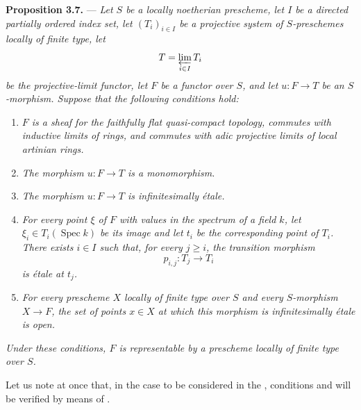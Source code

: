 
\medskip
\noindent{}\textbf{Proposition 3.7.} ---
\textit{Let \(S\) be a locally noetherian prescheme, let \(I\) be a
directed partially ordered index set, let \((T_i)_{i\in I}\) be a
projective system of \(S\)-preschemes locally of finite type, let
\[
  T=\varprojlim_{i\in I}T_i
\]
be the projective-limit functor, let \(F\) be a functor over \(S\),
and let \(u:F\to T\) be an \(S\)-morphism.  Suppose that the following
conditions hold:}

\begin{enumerate}
\item[(a)] %
\textit{\(F\) is a sheaf for the faithfully flat quasi-compact
topology, commutes with inductive limits of rings, and commutes with
adic projective limits of local artinian rings.}

\item[(b)] %
\textit{The morphism \(u:F\to T\) is a monomorphism.}

\item[\(b'\)] %
\textit{The morphism \(u:F\to T\) is infinitesimally étale.}

\item[(c)] %
\textit{For every point \(\xi\) of \(F\) with values in the spectrum
of a field \(k\), let
\(\xi_i\in T_i(\operatorname{Spec}k)\) be its image and let \(t_i\)
be the corresponding point of \(T_i\).  There exists \(i\in I\) such
that, for every \(j\geq i\), the transition morphism
\[
  p_{i,j}:T_j\longrightarrow T_i
\]
is étale at \(t_j\).}

\item[(d)] %
\textit{For every prescheme \(X\) locally of finite type over \(S\)
and every \(S\)-morphism \(X\to F\), the set of points \(x\in X\) at
which this morphism is infinitesimally étale is open.}
\end{enumerate}

\textit{Under these conditions, \(F\) is representable by a
prescheme locally of finite type over \(S\).}

Let us note at once that, in the case to be considered in the , conditions  and  will be verified by means of .

